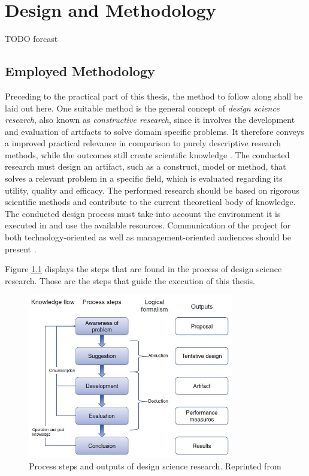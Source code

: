 \chapter{Design and Methodology}
\label{chap:design}
TODO forcast



\section{Employed Methodology}

Preceding to the practical part of this thesis, 
the method to follow along shall be laid out here.
One suitable method is the general concept of \emph{design science research}, also known as \emph{constructive research}, 
since it involves the development and evaluation of artifacts to solve domain specific problems.
It therefore conveys a improved practical relevance in comparison to purely descriptive research methods,
while the outcomes still create scientific knowledge
\autocite[][p.~v]{dresh2015designresearch}.
The conducted research must design an artifact, such as a construct, model or method, that solves a relevant problem in a specific field, which is evaluated regarding its utility, quality and efficacy.
The performed research should be based on rigorous scientific methods and contribute to the current theoretical body of knowledge.
The conducted design process must take into account the environment it is executed in and use the available resources.
Communication of the project for both technology-oriented as well as management-oriented audiences should be present
\autocite[][p.~70]{dresh2015designresearch}.

Figure \ref{fig:design:designscience} displays the steps that are found in the process of design science research. 
Those are the steps that guide the execution of this thesis.

\begin{figure}[hbt]
	\centering
	\includegraphics[width=0.8\textwidth, keepaspectratio]{resources/designscienceresearchoutputs.jpg}
	\caption{\label{fig:design:designscience} Process steps and outputs of design science research. Reprinted from \textcite[][p.~83]{dresh2015designresearch}}
\end{figure}

